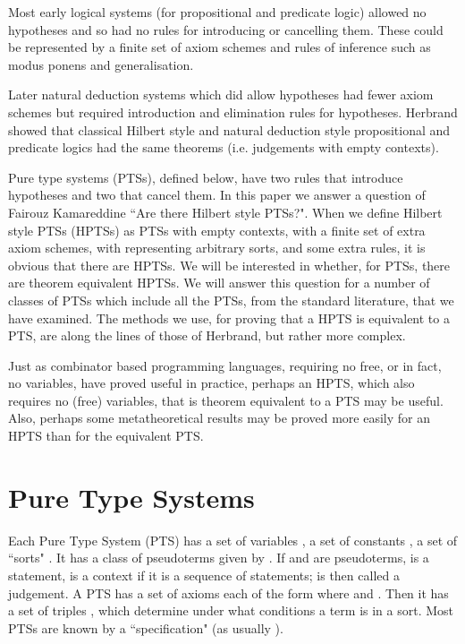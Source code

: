\documentclass{LMCS}
\begin{document}
  \noindent Most early logical systems (for propositional and
  predicate logic) allowed no hypotheses and so had no rules for
  introducing or cancelling them.  These could be represented by a
  finite set of axiom schemes and rules of inference such as modus
  ponens and generalisation.

  Later natural deduction systems which did allow hypotheses had fewer
  axiom schemes but required introduction and elimination rules for
  hypotheses. Herbrand showed that classical Hilbert style and natural
  deduction style propositional and predicate logics had the same
  theorems (i.e. judgements with empty contexts).

  Pure type systems (PTSs), defined below, have two rules that
  introduce hypotheses and two that cancel them. In this paper we
  answer a question of Fairouz Kamareddine ``Are there Hilbert style
  PTSs?". When we define Hilbert style PTSs (HPTSs) as PTSs with empty
  contexts, with a finite set of extra axiom schemes, with  representing arbitrary sorts, and some extra rules, it is
  obvious that there are HPTSs. We will be interested in whether, for
  PTSs, there are theorem equivalent HPTSs. We will answer this
  question for a number of classes of PTSs which include all the PTSs,
  from the standard literature, that we have examined. The methods we
  use, for proving that a HPTS is equivalent to a PTS, are along the
  lines of those of Herbrand, but rather more complex.

  Just as combinator based programming languages, requiring no free,
  or in fact, no variables, have proved useful in practice, perhaps an
  HPTS, which also requires no (free) variables, that is theorem
  equivalent to a PTS may be useful. Also, perhaps some
  metatheoretical results may be proved more easily for an HPTS than
  for the equivalent PTS.

\section{Pure Type Systems}\label{S:PTS}

  \noindent Each Pure Type System (PTS)  has a set of
  variables , a set of constants , a set of ``sorts"
  . It has a class of pseudoterms
  given by . If
   and  are pseudoterms,  is a statement,  is a
  context if it is a sequence of statements;  is
  then called a judgement. A PTS has a set of axioms 
  each of the form  where  and . Then it has a set  of triples
  , which determine under what
  conditions a term  is in a sort.  Most PTSs are known
  by a ``specification"  (as
  usually ).
\end{document}
